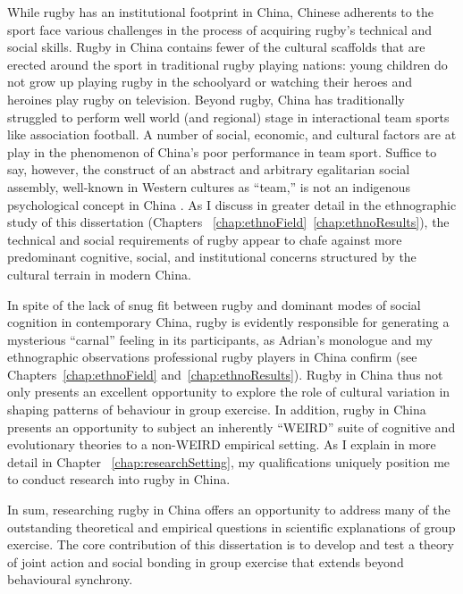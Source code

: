 \begin{CJK}{UTF8}{gbsn}
While rugby has an institutional footprint in China, Chinese adherents to the sport face various challenges in the process of acquiring rugby's technical and social skills.  Rugby in China contains fewer of the cultural scaffolds that are erected around the sport in traditional rugby playing nations: young children do not grow up playing rugby in the schoolyard or watching their heroes and heroines play rugby on television. Beyond rugby, China has traditionally struggled to perform well world (and regional) stage in interactional team sports like association football.  A number of social, economic, and cultural factors are at play in the phenomenon of China's poor performance in team sport.  Suffice to say, however, the construct of an abstract and arbitrary egalitarian social assembly, well-known in Western cultures as ``team,'' is not an indigenous psychological concept in China \cite{Liu2009}.  As I discuss in greater detail in the ethnographic study of this dissertation (Chapters ~\ref{chap:ethnoField}\nobreakdash~\ref{chap:ethnoResults}), the technical and social requirements of rugby appear to chafe against more predominant cognitive, social, and institutional concerns structured by the cultural terrain in modern China.

In spite of the lack of snug fit between rugby and dominant modes of social cognition in contemporary China, rugby is evidently responsible for generating a mysterious ``carnal'' feeling in its participants, as Adrian's monologue and my ethnographic observations professional rugby players in China confirm (see Chapters~\ref{chap:ethnoField} and~\ref{chap:ethnoResults}).  Rugby in China thus not only presents an excellent opportunity to explore the role of cultural variation in shaping patterns of behaviour in group exercise.  In addition, rugby in China presents an opportunity to subject an inherently ``WEIRD'' \citep[Western, Educated, Industrial, Rich, and Democratic; cf.][]{Henrich2010d} suite of cognitive and evolutionary theories to a non-WEIRD empirical setting.  As I explain in more detail in Chapter ~\ref{chap:researchSetting}, my qualifications uniquely position me to conduct research into rugby in China.

In sum, researching rugby in China offers an opportunity to address many of the outstanding theoretical and empirical questions in scientific explanations of group exercise.  The core contribution of this dissertation is to develop and test a theory of joint action and social bonding in group exercise that extends beyond behavioural synchrony.



\end{CJK}

